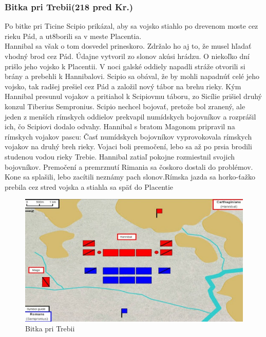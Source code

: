 \documentclass{article}
\begin{document}
\subsubsection{Bitka pri Trebii(218 pred Kr.)}
Po bitke pri Ticine Scipio prikázal, aby sa vojsko stiahlo po drevenom moste cez rieku Pád, a ut8borili sa v meste Placentia.\\Hannibal sa však o tom dosvedel prineskoro. Zdržalo ho aj to, že musel hľadať vhodný brod cez Pád. Údajne vytvoril zo slonov akúsi hrádzu. O niekoľko dní prišlo jeho vojsko k Placentii. V noci galské oddiely napadli stráže otvorili si brány a prebehli k Hannibalovi. Scipio sa obával, že by mohli napadnúť celé jeho vojsko, tak radšej prešiel cez Pád a založil nový tábor na brehu rieky. Kým Hannibal presunul vojakov a pritiahol k Scipiovmu táboru, zo Sicílie prišiel druhý konzul Tiberius Sempronius. Scipio nechcel bojovať, pretože bol zranený, ale jeden z menších rímskych oddielov prekvapil numídskych bojovníkov a rozprášil ich, čo Scipiovi dodalo odvahy. Hannibal s bratom Magonom pripravil na rímskych vojakov pascu: Časť numídskych bojovníkov vyprovokovala rímskych vojakov na druhý breh rieky. Vojaci boli premočení, lebo sa až po prsia brodili studenou vodou rieky Trebie. Hannibal zatiaľ pokojne rozmiestnil svojich bojovníkov. Premočení a  premrznutí Rimania sa čoskoro dostali do problémov. Kone sa splašili, lebo zacítili neznámy pach slonov.Rímska jazda sa horko-ťažko prebila cez stred vojska a stiahla sa späť do Placentie
\begin{figure}
\center
\includegraphics[scale=0.5]{trebius.jpg}
\caption{Bitka pri Trebii}
\end{figure}
\end{document}
